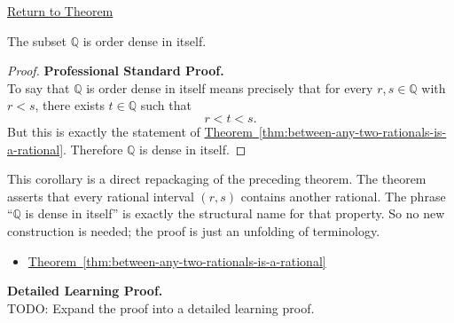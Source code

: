 \newpage
{}
\label{prf:q-dense-in-itself}

\begin{remark*}[Return]
\hyperref[cor:q-dense-in-itself]{Return to Theorem}
\end{remark*}

\begin{theorem*}
The subset $\mathbb{Q}$ is order dense in itself.
\end{theorem*}

\begin{proof}
\textbf{Professional Standard Proof.}~\\
To say that $\mathbb{Q}$ is order dense in itself means precisely that for
every $r,s\in\mathbb{Q}$ with $r<s$, there exists $t\in\mathbb{Q}$ such that
\[
r<t<s.
\]
But this is exactly the statement of
\hyperref[thm:between-any-two-rationals-is-a-rational]{Theorem~\ref*{thm:between-any-two-rationals-is-a-rational}}.
Therefore $\mathbb{Q}$ is dense in itself.
\end{proof}

\begin{remark*}
This corollary is a direct repackaging of the preceding theorem.  The theorem
asserts that every rational interval $(r,s)$ contains another rational.  The
phrase “$\mathbb{Q}$ is dense in itself” is exactly the structural name for
that property.  So no new construction is needed; the proof is just an
unfolding of terminology.
\end{remark*}

\begin{dependencies}
\begin{itemize}
  \item \hyperref[thm:between-any-two-rationals-is-a-rational]{Theorem~\ref*{thm:between-any-two-rationals-is-a-rational}}
\end{itemize}
\end{dependencies}

\textbf{Detailed Learning Proof.}~\\
TODO: Expand the proof into a detailed learning proof.

